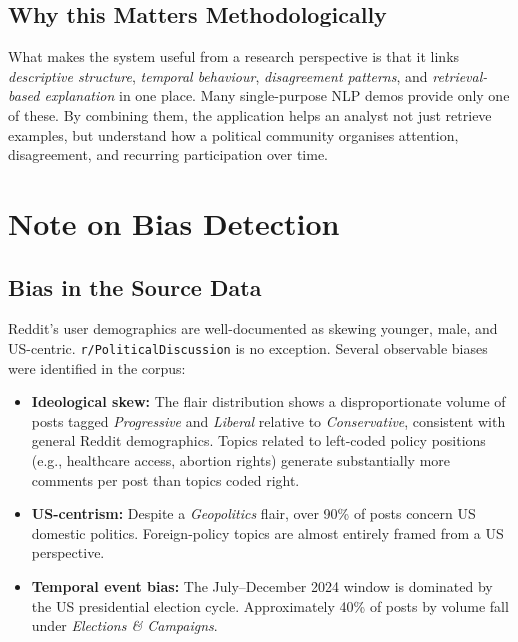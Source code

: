 \documentclass[11pt,a4paper]{article}
\begin{document}
\subsection{Why this Matters Methodologically}

What makes the system useful from a research perspective is that it links \textit{descriptive structure}, \textit{temporal behaviour}, \textit{disagreement patterns}, and \textit{retrieval-based explanation} in one place. Many single-purpose NLP demos provide only one of these. By combining them, the application helps an analyst not just retrieve examples, but understand how a political community organises attention, disagreement, and recurring participation over time.

\section{Note on Bias Detection}

\subsection{Bias in the Source Data}

Reddit's user demographics are well-documented as skewing younger, male, and US-centric. \texttt{r/PoliticalDiscussion} is no exception. Several observable biases were identified in the corpus:

\begin{itemize}
  \item \textbf{Ideological skew:} The flair distribution shows a disproportionate volume of posts tagged \textit{Progressive} and \textit{Liberal} relative to \textit{Conservative}, consistent with general Reddit demographics. Topics related to left-coded policy positions (e.g., healthcare access, abortion rights) generate substantially more comments per post than topics coded right.
  \item \textbf{US-centrism:} Despite a \textit{Geopolitics} flair, over 90\% of posts concern US domestic politics. Foreign-policy topics are almost entirely framed from a US perspective.
  \item \textbf{Temporal event bias:} The July--December 2024 window is dominated by the US presidential election cycle. Approximately 40\% of posts by volume fall under \textit{Elections \& Campaigns}.
\end{itemize}
\end{document}
